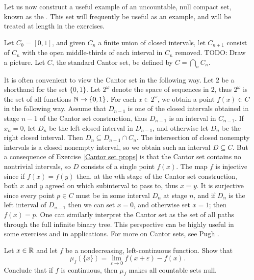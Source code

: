 \begin{subsec}
Let us now construct a useful example of an uncountable, null compact set, known as the .
This set will frequently be useful as an example, and will be treated at length in the exercises.

Let $C_0 = [0, 1]$, and given $C_{n}$ a finite union of closed intervals, let $C_{n+1}$ consist of $C_{n}$ with the open middle-thirds of each interval in $C_{n}$ removed. TODO: Draw a picture.
Let $C$, the standard Cantor set, be defined by $C = \bigcap_{n} C_{n}$.
\end{subsec}

\begin{subsec}
It is often convenient to view the Cantor set in the following way. Let $2$ be a shorthand for the set $\{0, 1\}$.
Let $2^\omega$ denote the space of sequences in $2$, thus $2^\omega$ is the set of all functions $\mathbb{N} \to \{0, 1\}$.
For each $x \in 2^\omega$, we obtain a point $f(x) \in C$ in the following way.
Assume that $D_{n-1}$ is one of the closed intervals obtained in stage $n-1$ of the Cantor set construction, thus $D_{n-1}$ is an interval in $C_{n-1}$.
If $x_{n} = 0$, let $D_{n}$ be the left closed interval in $D_{n-1}$, and otherwise let $D_{n}$ be the right closed interval.
Then $D_{n} \subseteq D_{n-1} \cap C_{n}$.
The intersection of closed nonempty intervals is a closed nonempty interval, so we obtain such an interval $D \subseteq C$.
But a consequence of Exercise \ref{Cantor set props} is that the Cantor set contains no nontrivial intervals, so $D$ consists of a single point $f(x)$.
The map $f$ is injective since if $f(x) = f(y)$ then, at the $n$th stage of the Cantor set construction, both $x$ and $y$ agreed on which subinterval to pass to, thus $x = y$.
It is surjective since every point $p \in C$ must be in some interval $D_{n}$ at stage $n$, and if $D_{n}$ is the left interval of $D_{n-1}$ then we can set $x = 0$, and otherwise set $x = 1$; then $f(x) = p$.
One can similarly interpret the Cantor set as the set of all paths through the full infinite binary tree.
This perspective can be highly useful in some exercises and in applications.
For more on Cantor sets, see Pugh \cite[Chapter 2]{pugh2013real}.
\end{subsec}

\begin{exercise}
Let $x \in \mathbb{R}$ and let $f$ be a nondecreasing, left-continuous function. Show that
\[\mu_f(\{x\}) = \lim_{\varepsilon \to 0} f(x+\varepsilon) - f(x).\]
Conclude that if $f$ is continuous, then $\mu_f$ makes all countable sets null.
\end{exercise}

